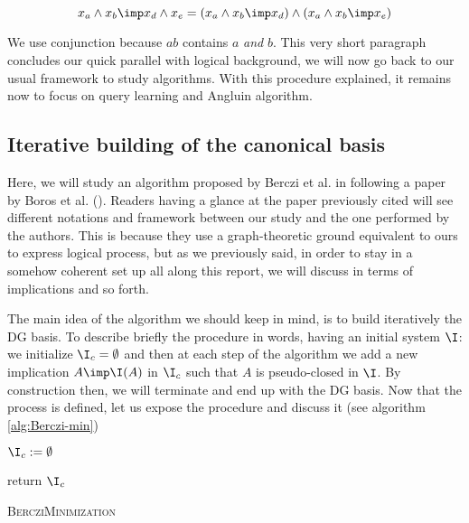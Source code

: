 	\[ x_a \land x_b \imp x_d \land x_e = (x_a \land x_b \imp x_d)
	\land (x_a \land x_b \imp x_e) \]

\noindent We use conjunction because $ab$ contains $a$ \textit{and} $b$. This
very short paragraph concludes our quick parallel with logical background, we will now go back to our usual framework to study algorithms. With this procedure explained, it remains now to focus on query learning and Angluin algorithm.

\subsection{Iterative building of the canonical basis}

Here, we will study an algorithm proposed by Berczi et al. in 
\cite{berczi_directed_2017} following a paper by Boros et al. 
(\cite{boros_strong_2017}). Readers having a glance at the paper previously 
cited will see different notations and framework between our study and the one 
performed by the authors. This is because they use a graph-theoretic ground 
equivalent to ours to express logical process, but as we previously said, in order to stay in a somehow coherent set up all along this report, we will discuss in terms of implications and so forth.

\vspace{1.2em}

The main idea of the algorithm we should keep in mind, is to build iteratively
the DG basis. To describe briefly the procedure in words, having an initial 
system $\I$: we initialize $\I_c = \emptyset$ and then at each step of the 
algorithm we add a new implication $A \imp \I(A)$ in $\I_c$ such that $A$ is 
pseudo-closed in $\I$. By construction then, we will terminate and end up with 
the DG basis. Now that the process is defined, let us expose the procedure
and discuss it (see algorithm \ref{alg:Berczi-min})

\begin{algorithm}
	
	\BlankLine
	\BlankLine
	
	$\I_c := \emptyset$ \;
	
	
	return $\I_c$ \;
	
	\caption{\textsc{BercziMinimization}}
	\label{alg:Berczi-min}
\end{algorithm}

